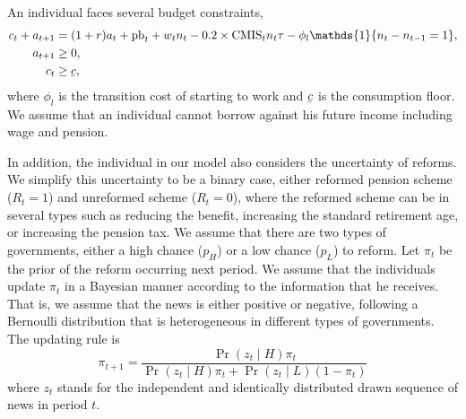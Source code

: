 \documentclass[12pt]{article}
\begin{document}
\begin{CJK*}{UTF8}{bsmi}
An individual faces several budget constraints,
\begin{align}
    c_t + a_{t+1} &= (1+r)a_t + \text{pb}_t + w_tn_t - 0.2\times\text{CMIS}_tn_t\tau - \phi_l\mathds{1}\{n_t-n_{t-1}=1\},\label{eq:asset-accumulation}\\
    a_{t+1} &\geq 0,\label{eq:no-borrow}\\
    c_t &\geq \underaccent{\bar}{c}\label{eq:cfloor},
\end{align}
where \(\phi_l\) is the transition cost of starting to work 
and \(\underaccent{\bar}{c}\) is the consumption floor. We 
assume that an individual cannot borrow against his future 
income including wage and pension. 

In addition, the individual in our model also considers the 
uncertainty of reforms. We simplify this uncertainty to be a 
binary case, either reformed pension scheme (\(R_t = 1\)) and 
unreformed scheme (\(R_t = 0\)), where the reformed scheme 
can be in several types such as reducing the benefit, 
increasing the standard retirement age, or increasing the 
pension tax. We assume that there are two types of 
governments, either a high chance (\(p_H\)) or a low chance 
(\(p_L\)) to reform. Let \(\pi_t\) be the prior of the reform 
occurring next period. We assume that the individuals update 
\(\pi_t\) in a Bayesian manner according to the information 
that he receives. That is, we assume that the news is either 
positive or negative, following a Bernoulli distribution that 
is heterogeneous in different types of governments. The 
updating rule is 
\begin{equation}\label{eq:update}
    \pi_{t+1} 
    = \frac{\Pr(z_t\mid H)\pi_t}{\Pr(z_t\mid H)\pi_t + \Pr(z_t\mid L)(1-\pi_t)}
\end{equation}
where \(z_t\) stands for the independent and identically 
distributed drawn sequence of news in period \(t\).


\end{CJK*}
\end{document}
